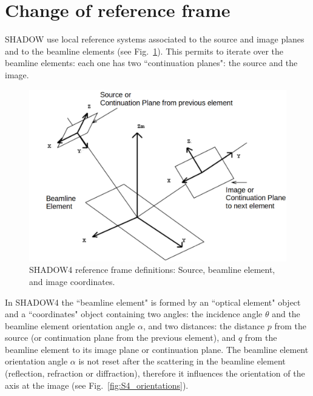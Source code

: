 \documentclass{iucr}
\begin{document}
\section{Change of reference frame}
\label{sec:change_frame}

SHADOW use local reference systems associated to the source and image planes and to the beamline elements (see Fig.~\ref{fig:S4_reference_frame}).
This permits to iterate over the beamline elements: each one has two ``continuation planes": the source and the image. 

\begin{figure}
\label{fig:S4_reference_frame}
    \centering
\includegraphics[width=0.9\linewidth]{figures/S4_reference_frame.png}
\caption{SHADOW4 reference frame definitions: Source, beamline element, and image coordinates.}  
\end{figure}

In SHADOW4 the ``beamline element" is formed by an ``optical element" object and a ``coordinates" object containing two angles: the incidence angle $\theta$ and the beamline element orientation angle $\alpha$, and two distances: the distance $p$ from the source (or continuation plane from the previous element), and $q$ from the beamline element to its image plane or continuation plane.
The beamline element orientation angle $\alpha$ is not reset after the scattering in the beamline element (reflection, refraction or diffraction), therefore it influences the orientation of the axis at the image (see Fig.~\ref{fig:S4_orientations}).
\end{document}
